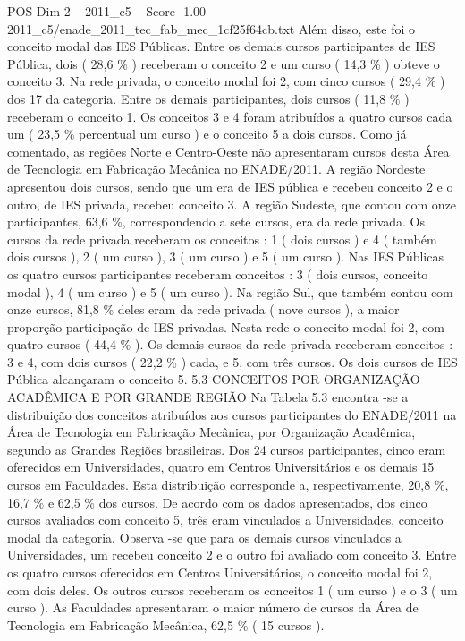 \begin{textsample}{POS Dim 2 – 2011\_c5 – Score -1.00 – 2011\_c5/enade\_2011\_tec\_fab\_mec\_1cf25f64cb.txt}
Além disso, este foi o conceito modal das IES Públicas.
Entre os demais cursos participantes de IES Pública, dois ( 28,6 \% ) receberam o conceito 2 e um curso ( 14,3 \% ) obteve o conceito 3.
Na rede privada, o conceito modal foi 2, com cinco cursos ( 29,4 \% ) dos 17 da categoria.
Entre os demais participantes, dois cursos ( 11,8 \% ) receberam o conceito 1.
Os conceitos 3 e 4 foram atribuídos a quatro cursos cada um ( 23,5 \% percentual um curso ) e o conceito 5 a dois cursos.
Como já comentado, as regiões Norte e Centro-Oeste não apresentaram cursos desta Área de Tecnologia em Fabricação Mecânica no ENADE/2011.
A região Nordeste apresentou dois cursos, sendo que um era de IES pública e recebeu conceito 2 e o outro, de IES privada, recebeu conceito 3.
A região Sudeste, que contou com onze participantes, 63,6 \%, correspondendo a sete cursos, era da rede privada.
Os cursos da rede privada receberam os conceitos : 1 ( dois cursos ) e 4 ( também dois cursos ), 2 ( um curso ), 3 ( um curso ) e 5 ( um curso ).
Nas IES Públicas os quatro cursos participantes receberam conceitos : 3 ( dois cursos, conceito modal ), 4 ( um curso ) e 5 ( um curso ).
Na região Sul, que também contou com onze cursos, 81,8 \% deles eram da rede privada ( nove cursos ), a maior proporção participação de IES privadas.
Nesta rede o conceito modal foi 2, com quatro cursos ( 44,4 \% ).
Os demais cursos da rede privada receberam conceitos : 3 e 4, com dois cursos ( 22,2 \% ) cada, e 5, com três cursos.
Os dois cursos de IES Pública alcançaram o conceito 5. 5.3 CONCEITOS POR ORGANIZAÇÃO ACADÊMICA E POR GRANDE REGIÃO Na Tabela 5.3 encontra -se a distribuição dos conceitos atribuídos aos cursos participantes do ENADE/2011 na Área de Tecnologia em Fabricação Mecânica, por Organização Acadêmica, segundo as Grandes Regiões brasileiras.
Dos 24 cursos participantes, cinco eram oferecidos em Universidades, quatro em Centros Universitários e os demais 15 cursos em Faculdades.
Esta distribuição corresponde a, respectivamente, 20,8 \%, 16,7 \% e 62,5 \% dos cursos.
De acordo com os dados apresentados, dos cinco cursos avaliados com conceito 5, três eram vinculados a Universidades, conceito modal da categoria.
Observa -se que para os demais cursos vinculados a Universidades, um recebeu conceito 2 e o outro foi avaliado com conceito 3.
Entre os quatro cursos oferecidos em Centros Universitários, o conceito modal foi 2, com dois deles.
Os outros cursos receberam os conceitos 1 ( um curso ) e o 3 ( um curso ).
As Faculdades apresentaram o maior número de cursos da Área de Tecnologia em Fabricação Mecânica, 62,5 \% ( 15 cursos ).

\end{textsample}
